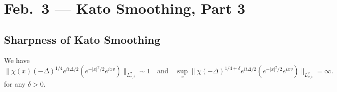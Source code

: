 \chapter{Feb.~3 --- Kato Smoothing, Part 3}

\section{Sharpness of Kato Smoothing}

\begin{lemma}
  We have
  \[
    \|\chi(x) (-\Delta)^{1 / 4} e^{i t \Delta / 2} (e^{-|x|^2 / 2} e^{ixv})\|_{L^2_{x, t}} \sim 1
    \quad \text{and} \quad
    \sup_{v} \| \chi (-\Delta)^{1 / 4 + \delta} e^{it\Delta / 2} (e^{-|x|^2 / 2} e^{ixv}) \|_{L^2_{x, t}} = \infty.
  \]
  for any $\delta > 0$.
\end{lemma}

